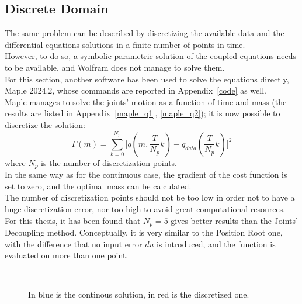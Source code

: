 \documentclass[a4paper,12pt,oneside]{report}
\begin{document}
\subsection{Discrete Domain}
The same problem can be described by discretizing the available data and the differential equations solutions in a finite number of points in time.\\
However, to do so, a symbolic parametric solution of the coupled equations needs to be available, and Wolfram does not manage to solve them.\\
For this section, another software has been used to solve the equations directly, Maple 2024.2, whose commands are reported in Appendix~\ref{code} as well.\\
Maple manages to solve the joints' motion as a function of time and mass (the results are listed in Appendix~\ref{maple_q1}, \ref{maple_q2}); it is now possible to discretize the solution:
\begin{equation}
  \varGamma(m)=\sum_{k=0}^{N_p}\Big[q(m,\frac{T}{N_p}k)-q_{data}(\frac{T}{N_p}k)\Big]^2
\end{equation}
where $N_p$ is the number of discretization points.\\
In the same way as for the continuous case, the gradient of the cost function is set to zero, and the optimal mass can be calculated.\\
The number of discretization points should not be too low in order not to have a huge discretization error, nor too high to avoid great computational resources.\\
For this thesis, it has been found that $N_p=5$ gives better results than the Joints' Decoupling method. Conceptually, it is very similar to the Position Root one, with the difference that no input error $du$ is introduced, and the function is evaluated on more than one point.
\begin{figure}[h]
  \centering
  \subfloat[\emph{$N_p=5$.}]
  {} \quad
\subfloat[\emph{$N_p=25$.}]
  {}\\
  \subfloat[\emph{$N_p=50$.}]
  {}
  \caption{In blue is the continous solution, in red is the discretized one.}
\end{figure}
\newpage
\end{document}
